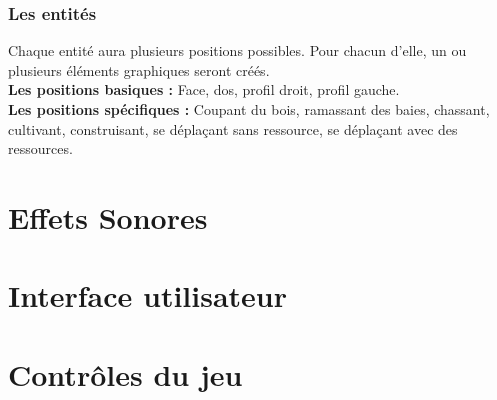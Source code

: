 \documentclass[a4paper]{article}
\begin{document}
    \section{Les entités}
      Chaque entité aura plusieurs positions possibles. Pour chacun d'elle, un ou plusieurs éléments graphiques seront créés.\\
      \textbf{Les positions basiques :}\small{ Face, dos, profil droit, profil gauche.}\\
      \textbf{Les positions spécifiques :}\small{ Coupant du bois, ramassant des baies, chassant, cultivant, construisant, se déplaçant sans ressource, se déplaçant avec des ressources.}


  \newpage
  \part{Effets Sonores}
  


  \newpage
  \part{Interface utilisateur}
  


  \newpage
  \part{Contrôles du jeu}
  
  
\end{document}
